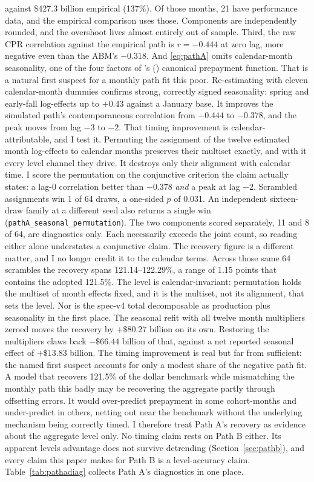 \documentclass[12pt]{article}
\newcommand{\citepos}[1]{\citeauthor{#1}'s (\citeyear{#1})}
\begin{document}
against \$427.3 billion empirical (137\%). Of those months, 21 have performance data, and the empirical comparison uses those. Components are independently rounded, and the overshoot lives almost entirely out of sample. Third, the raw CPR correlation against the empirical path is $r = -0.444$ at zero lag, more negative even than the ABM's $-0.318$. And \eqref{eq:pathA} omits calendar-month seasonality, one of the four factors of \citepos{richard1989} canonical prepayment function. That is a natural first suspect for a monthly path fit this poor. Re-estimating with eleven calendar-month dummies confirms strong, correctly signed seasonality: spring and early-fall log-effects up to $+0.43$ against a January base. It improves the simulated path's contemporaneous correlation from $-0.444$ to $-0.378$, and the peak moves from lag $-3$ to $-2$. That timing improvement is calendar-attributable, and I test it. Permuting the assignment of the twelve estimated month log-effects to calendar months preserves their multiset exactly, and with it every level channel they drive. It destroys only their alignment with calendar time. I score the permutation on the conjunctive criterion the claim actually states: a lag-0 correlation better than $-0.378$ \emph{and} a peak at lag $-2$. Scrambled assignments win 1 of 64 draws, a one-sided $p$ of 0.031. An independent sixteen-draw family at a different seed also returns a single win (\texttt{pathA\_seasonal\_permutation}). The two components scored separately, 11 and 8 of 64, are diagnostics only. Each necessarily exceeds the joint count, so reading either alone understates a conjunctive claim. The recovery figure is a different matter, and I no longer credit it to the calendar terms. Across those same 64 scrambles the recovery spans 121.14--122.29\%, a range of 1.15 points that contains the adopted 121.5\%. The level is calendar-invariant: permutation holds the multiset of month effects fixed, and it is the multiset, not its alignment, that sets the level. Nor is the spec-v4 total decomposable as production plus seasonality in the first place. The seasonal refit with all twelve month multipliers zeroed moves the recovery by $+\$80.27$ billion on its own. Restoring the multipliers claws back $-\$66.44$ billion of that, against a net reported seasonal effect of $+\$13.83$ billion. The timing improvement is real but far from sufficient: the named first suspect accounts for only a modest share of the negative path fit. A model that recovers 121.5\% of the dollar benchmark while mismatching the monthly path this badly may be recovering the aggregate partly through offsetting errors. It would over-predict prepayment in some cohort-months and under-predict in others, netting out near the benchmark without the underlying mechanism being correctly timed. I therefore treat Path A's recovery as evidence about the aggregate level only. No timing claim rests on Path B either. Its apparent levels advantage does not survive detrending (Section~\ref{sec:pathb}), and every claim this paper makes for Path B is a level-accuracy claim. Table~\ref{tab:pathadiag} collects Path A's diagnostics in one place.
\end{document}
